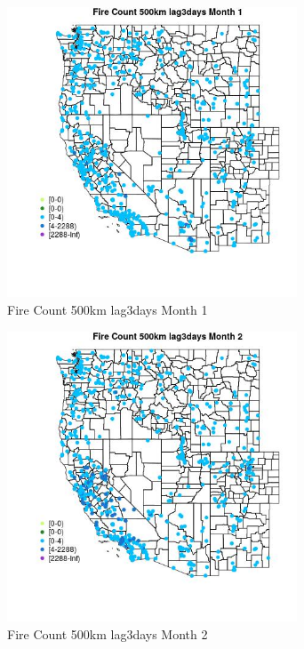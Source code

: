 \begin{figure} 
\centering  
\includegraphics[width=0.77\textwidth]{Code_Outputs/Report_ML_input_PM25_Step4_part_e_de_duplicated_aves_compiled_2019-05-21wNAs_MapObsMo1Fire_Count_500km_lag3days.jpg} 
\caption{\label{fig:Report_ML_input_PM25_Step4_part_e_de_duplicated_aves_compiled_2019-05-21wNAsMapObsMo1Fire_Count_500km_lag3days}Fire Count 500km lag3days Month 1} 
\end{figure} 
 

\begin{figure} 
\centering  
\includegraphics[width=0.77\textwidth]{Code_Outputs/Report_ML_input_PM25_Step4_part_e_de_duplicated_aves_compiled_2019-05-21wNAs_MapObsMo2Fire_Count_500km_lag3days.jpg} 
\caption{\label{fig:Report_ML_input_PM25_Step4_part_e_de_duplicated_aves_compiled_2019-05-21wNAsMapObsMo2Fire_Count_500km_lag3days}Fire Count 500km lag3days Month 2} 
\end{figure} 
 

